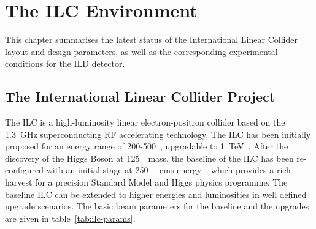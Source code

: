 \chapter{The ILC Environment}
\label{chap:ilc}
\label{ild:sec:ilc}

This chapter summarises the latest status of the International Linear Collider layout and design parameters, as well as the corresponding experimental conditions for the ILD detector.

\section{The International Linear Collider Project}
The ILC is a high-luminosity linear electron-positron collider based on the 1.3~GHz superconducting RF accelerating technology. The ILC has been initially proposed for an energy range of 200-500~\GeV, upgradable to 1~TeV~\cite{Behnke:2013xla}. After the discovery of the Higgs Boson at 125~\GeV~mass, the baseline of the ILC has been re-configured with an initial stage at 250~\GeV~ cms energy~\cite{Bambade:2019fyw}, which provides a rich harvest for a precision Standard Model and Higgs physics programme. The baseline ILC can be extended to higher energies and luminosities in well defined upgrade scenarios. The basic beam parameters for the baseline and the upgrades are given in table~\ref{tab:ilc-params}.

